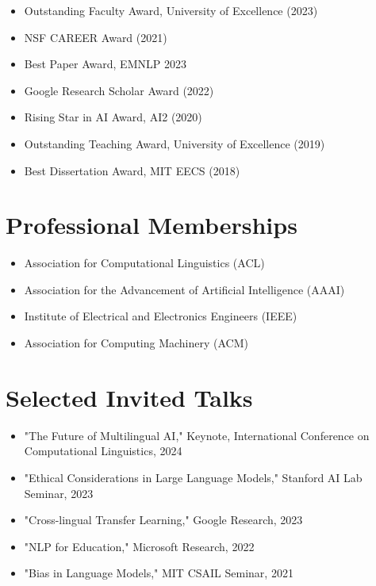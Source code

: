 \documentclass[11pt,letterpaper]{article}
\begin{document}
\begin{itemize}[noitemsep]
    \item Outstanding Faculty Award, University of Excellence (2023)
    \item NSF CAREER Award (2021)
    \item Best Paper Award, EMNLP 2023
    \item Google Research Scholar Award (2022)
    \item Rising Star in AI Award, AI2 (2020)
    \item Outstanding Teaching Award, University of Excellence (2019)
    \item Best Dissertation Award, MIT EECS (2018)
\end{itemize}

\section{Professional Memberships}

\begin{itemize}[noitemsep]
    \item Association for Computational Linguistics (ACL)
    \item Association for the Advancement of Artificial Intelligence (AAAI)
    \item Institute of Electrical and Electronics Engineers (IEEE)
    \item Association for Computing Machinery (ACM)
\end{itemize}

\section{Selected Invited Talks}

\begin{itemize}[noitemsep]
    \item "The Future of Multilingual AI," Keynote, International Conference on Computational Linguistics, 2024
    \item "Ethical Considerations in Large Language Models," Stanford AI Lab Seminar, 2023
    \item "Cross-lingual Transfer Learning," Google Research, 2023
    \item "NLP for Education," Microsoft Research, 2022
    \item "Bias in Language Models," MIT CSAIL Seminar, 2021
\end{itemize}
\end{document}
